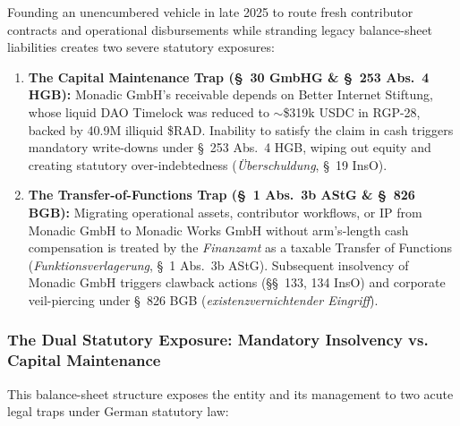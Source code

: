 \documentclass[a4paper,11pt,twoside,parskip=half-,headings=small]{scrartcl}
\begin{document}
Founding an unencumbered vehicle in late 2025 to route fresh contributor contracts and operational disbursements while stranding legacy balance-sheet liabilities creates two severe statutory exposures:
\begin{enumerate}[nosep]
  \item \textbf{The Capital Maintenance Trap (\S~30 GmbHG \& \S~253 Abs.~4 HGB):} Monadic GmbH's  receivable depends on Better Internet Stiftung, whose liquid DAO Timelock was reduced to $\sim$\$319k USDC in RGP-28, backed by 40.9M illiquid \$RAD. Inability to satisfy the claim in cash triggers mandatory write-downs under \S~253 Abs.~4 HGB, wiping out  equity and creating statutory over-indebtedness (\emph{{\"U}berschuldung}, \S~19 InsO).
  \item \textbf{The Transfer-of-Functions Trap (\S~1 Abs.~3b AStG \& \S~826 BGB):} Migrating operational assets, contributor workflows, or IP from Monadic GmbH to Monadic Works GmbH without arm's-length cash compensation is treated by the \emph{Finanzamt} as a taxable Transfer of Functions (\emph{Funktionsverlagerung}, \S~1 Abs.~3b AStG). Subsequent insolvency of Monadic GmbH triggers clawback actions (\S\S~133, 134 InsO) and corporate veil-piercing under \S~826 BGB (\emph{existenzvernichtender Eingriff}).
\end{enumerate}

\clearpage

\subsubsection{The Dual Statutory Exposure: Mandatory Insolvency vs. Capital Maintenance}
\label{sec:monadic_dual_exposure}

This balance-sheet structure exposes the entity and its management to two acute legal traps under German statutory law:
\end{document}
